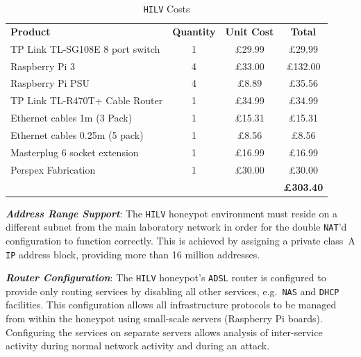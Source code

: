 \documentclass{ieeeaccess}
\begin{document}
\begin{table}[ht]
  \caption{\texttt{HILV} Costs\label{table:HILVCosts}}
  \begin{center}
  \setlength\doublerulesep{0.5pt}  
  \begin{tabular}{| l || c | c | c |}
  \hline
  \textbf{Product} & \textbf{Quantity} & \textbf{Unit Cost} & \textbf{Total} \\
  \hhline{|=||=|=|=|}
  \scriptsize{TP Link TL-SG108E 8 port switch} & \scriptsize{1} & \scriptsize{\pounds29.99} & \scriptsize{\pounds29.99} \\
  \hline
  \scriptsize{Raspberry Pi 3} & \scriptsize{4} & \scriptsize{\pounds33.00} & \scriptsize{\pounds132.00} \\
  \hline
  \scriptsize{Raspberry Pi PSU} & \scriptsize{4} & \scriptsize{\pounds8.89} & \scriptsize{\pounds35.56} \\
  \hline
  \scriptsize{TP Link TL-R470T+ Cable Router} & \scriptsize{1} & \scriptsize{\pounds34.99} & \scriptsize{\pounds34.99} \\
  \hline
  \scriptsize{Ethernet cables 1m (3 Pack)} & \scriptsize{1} & \scriptsize{\pounds15.31} & \scriptsize{\pounds15.31} \\
  \hline
  \scriptsize{Ethernet cables 0.25m (5 pack)} & \scriptsize{1} & \scriptsize{\pounds8.56} & \scriptsize{\pounds8.56} \\
  \hline
  \scriptsize{Masterplug 6 socket extension} & \scriptsize{1} & \scriptsize{\pounds16.99} & \scriptsize{\pounds16.99} \\
  \hline
  \scriptsize{Perspex Fabrication} & \scriptsize{1} & \scriptsize{\pounds30.00} & \scriptsize{\pounds30.00} \\
  \hhline{|=||=|=|=|}
   &  &  & \textbf{\pounds303.40} \\
  \hline
  \end{tabular}
  \end{center}
  \end{table}

\noindent\textit{\textbf{Address Range Support}}:
The \texttt{HILV} honeypot environment must reside on a different subnet from
the main laboratory network in order for the double \texttt{NAT}'d
configuration to function correctly. This is achieved by assigning a private
class~A \texttt{IP} address block, providing more than 16 million addresses.
\newline\newline

\noindent\textit{\textbf{Router Configuration}}:
The \texttt{HILV} honeypot's \texttt{ADSL} router is configured to provide only
routing services by disabling all other services, e.g.\ \texttt{NAS} and
\texttt{DHCP} facilities. This configuration allows all infrastructure
protocols to be managed from within the honeypot using small-scale servers
(Raspberry Pi boards). Configuring the services on separate
servers allows analysis of inter-service activity during normal network
activity and during an attack.
\end{document}
